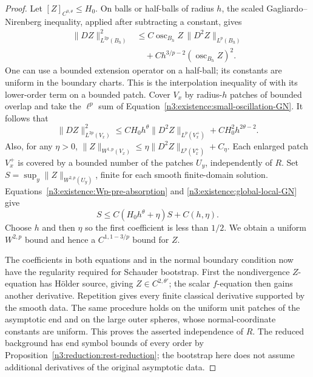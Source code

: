 \begin{proof}
Let $[Z]_{C^{0,\theta}}\le H_0$.  On balls or half-balls of
radius $h$, the scaled Gagliardo--Nirenberg inequality, applied after
subtracting a constant, gives
\begin{equation}\label{n3:existence:small-oscillation-GN}
 \begin{split}
 \|DZ\|_{L^{2p}(B_h)}^2
 &\le C\operatorname{osc}_{B_h}Z\,
                    \|D^2Z\|_{L^p(B_h)}\\
 &\quad+Ch^{3/p-2}(\operatorname{osc}_{B_h}Z)^2.
 \end{split}
\end{equation}
One can use a bounded extension operator on a half-ball; its constants
are uniform in the boundary charts.  This is the interpolation
inequality of \cite[Lecture II, Equation (2.2)]{Nirenberg1959}
with its lower-order term on a bounded patch.
Cover $V_x$ by radius-$h$ patches of bounded overlap and take the
$\ell^p$ sum of Equation~\eqref{n3:existence:small-oscillation-GN}.
It follows that
\begin{equation}\label{n3:existence:global-local-GN}
 \|DZ\|_{L^{2p}(V_x)}^2
 \le CH_0h^\theta\|D^2Z\|_{L^p(V_x^+)}
           +CH_0^2h^{2\theta-2}.
\end{equation}
Also, for any $\eta>0$,
$\|Z\|_{W^{1,p}(V_x)}
 \le\eta\|D^2Z\|_{L^p(V_x^+)}+C_\eta$.
Each enlarged patch $V_x^+$ is covered by a bounded number of the
patches $U_y$, independently of $R$.  Set
$S=\sup_y\|Z\|_{W^{2,p}(U_y)}$, finite for each smooth finite-domain
solution.  Equations~\eqref{n3:existence:Wp-pre-absorption} and
\eqref{n3:existence:global-local-GN} give
\begin{equation}\label{n3:existence:uniform-local-absorption}
 S\le C(H_0h^\theta+\eta)S+C(h,\eta).
\end{equation}
Choose $h$ and then $\eta$ so the first coefficient is less than
$1/2$.  We obtain a uniform $W^{2,p}$ bound and hence a
$C^{1,1-3/p}$ bound for $Z$.

The coefficients in both equations and in the normal boundary
condition now have the regularity required for Schauder bootstrap.
First the nondivergence $Z$-equation has H\"older source, giving
$Z\in C^{2,\theta'}$; the scalar $f$-equation then gains another
derivative.  Repetition gives every finite classical derivative
supported by the smooth data.  The same procedure holds on the
uniform unit patches of the asymptotic end and on the large outer
spheres, whose normal-coordinate constants are uniform.  This
proves the asserted independence of $R$.  The reduced background
has end symbol bounds of every order by
Proposition~\ref{n3:reduction:rest-reduction}; the bootstrap here
does not assume additional derivatives of the original asymptotic
data.
\end{proof}

